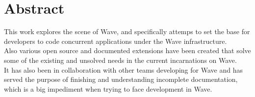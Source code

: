 \newpage
\renewcommand{\thepage}{\Roman{page}}
\setcounter{page}{7}
\section*{Abstract}
This work explores the scene of Wave, and specifically attemps to set the base for developers to code concurrent applications under the Wave infrastructure.\\[.2cm]
Also various open source and documented extensions have been created that solve some of the existing and unsolved needs in the current incarnations on Wave.\\[.2cm]
It has also been in collaboration with other teams developing for Wave and has served the purpose of finishing and understanding incomplete documentation, which is a big impediment when trying to face development in Wave. 
